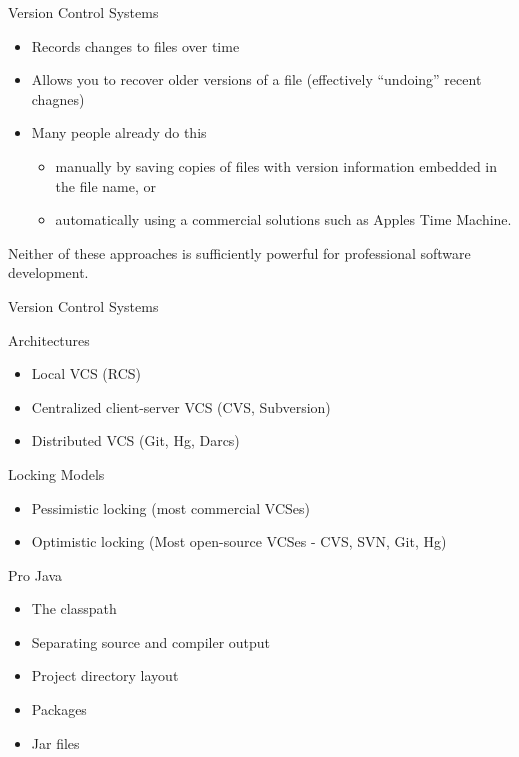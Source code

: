 \documentclass{beamer}
\author[Chris Simpkins] 
{Christopher Simpkins \\\texttt{chris.simpkins@gatech.edu}}
\institute[Georgia Tech] %
\date[CS 1331]{}
\begin{document}
\begin{frame}
  \titlepage
\end{frame}


\begin{frame}[fragile]{Version Control Systems}

\begin{itemize}
\item Records changes to files over time
\item Allows you to recover older versions of a file (effectively ``undoing'' recent chagnes)
\item Many people already do this
\begin{itemize}
\item manually by saving copies of files with version information embedded in the file name, or
\item automatically using a commercial solutions such as Apples Time Machine.
\end{itemize}
\end{itemize}

Neither of these approaches is sufficiently powerful for professional software development.

\end{frame}

\begin{frame}[fragile]{Version Control Systems}


Architectures
\begin{itemize}
\item Local VCS (RCS)
\item Centralized client-server VCS (CVS, Subversion)
\item Distributed VCS (Git, Hg, Darcs)
\end{itemize}
Locking Models
\begin{itemize}
\item Pessimistic locking (most commercial VCSes)
\item Optimistic locking (Most open-source VCSes - CVS, SVN, Git, Hg)
\end{itemize}

\end{frame}


\begin{frame}[fragile]{Pro Java}


\begin{itemize}
\item The classpath
\item Separating source and compiler output
\item Project directory layout
\item Packages
\item Jar files
\end{itemize}

\end{frame}
\end{document}
